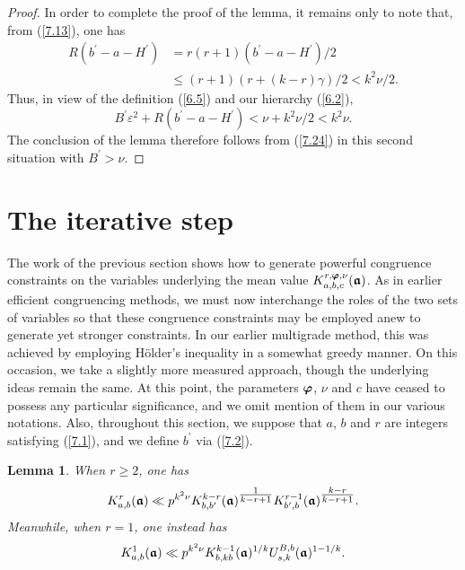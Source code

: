 \documentclass[12pt,reqno]{amsart}
\newtheorem{lemma}[theorem]{Lemma}
\theoremstyle{definition}
\theoremstyle{remark}
\numberwithin{equation}{section}
\def\gam{{\gamma}} \def\Gam{{\Gamma}}
\def\eps{\varepsilon}
\def\le{\leqslant} \def\ge{\geqslant} \def\pleq{\preccurlyeq} \def\ple{\prec}
\begin{document}
\begin{proof}
\par In order to complete the proof of the lemma, it remains only to note that, from 
(\ref{7.13}), one has
\begin{align*}
R(b^\prime -a-H^\prime)&= r(r+1)(b^\prime-a-H^\prime)/2\\
&\le (r+1)(r+(k-r)\gam)/2<k^2\nu/2.
\end{align*}
Thus, in view of the definition (\ref{6.5}) and our hierarchy (\ref{6.2}),
$$B^\prime \eps^2+R(b^\prime -a-H^\prime)<\nu +k^2\nu/2<k^2\nu .$$
The conclusion of the lemma therefore follows from (\ref{7.24}) in this second situation with 
$B^\prime >\nu$.
\end{proof}

\section{The iterative step} The work of the previous section shows how to generate 
powerful congruence constraints on the variables underlying the mean value 
$K_{a,b,c}^{r,{\boldsymbol \varphi},\nu}({\boldsymbol {{\mathfrak a}}})$. As in earlier efficient congruencing methods, we 
must now interchange the roles of the two sets of variables so that these congruence 
constraints may be employed anew to generate yet stronger constraints. In our earlier 
multigrade method, this was achieved by employing H\"older's inequality in a somewhat 
greedy manner. On this occasion, we take a slightly more measured approach, though the 
underlying ideas remain the same. At this point, the parameters ${\boldsymbol \varphi}$, $\nu$ and $c$ 
have ceased to possess any particular significance, and we omit mention of them in our 
various notations. Also, throughout this section, we suppose that $a$, $b$ and $r$ are 
integers satisfying (\ref{7.1}), and we define $b^\prime$ via (\ref{7.2}).

\begin{lemma}\label{lemma8.1} When $r\ge 2$, one has
\begin{equation}\label{8.1}
K_{a,b}^r({\boldsymbol {{\mathfrak a}}})\ll p^{k^2\nu}K_{b,b^\prime}^{k-r}({\boldsymbol {{\mathfrak a}}})^{\tfrac{1}{k-r+1}}
K_{b^\prime,b}^{r-1}({\boldsymbol {{\mathfrak a}}})^{\tfrac{k-r}{k-r+1}}.
\end{equation}
Meanwhile, when $r=1$, one instead has
\begin{equation}\label{8.2}
K_{a,b}^1({\boldsymbol {{\mathfrak a}}})\ll p^{k^2\nu}K_{b,kb}^{k-1}({\boldsymbol {{\mathfrak a}}})^{1/k}
U_{s,k}^{B,b}({\boldsymbol {{\mathfrak a}}})^{1-1/k}.
\end{equation}
\end{lemma}
\end{document}
